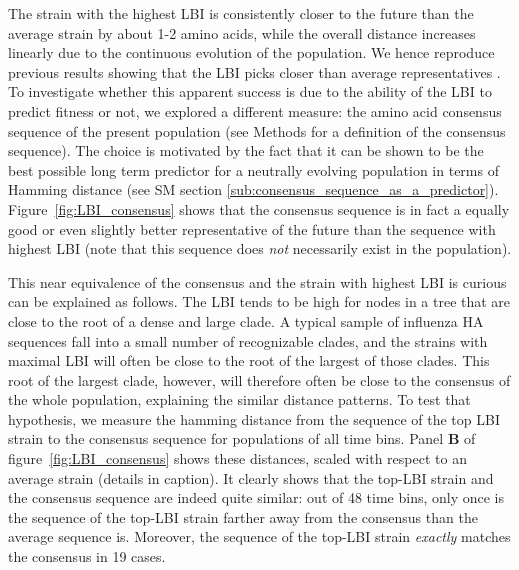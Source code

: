 \documentclass[reprint,amsmath,amssymb,superscriptaddress,showpacs,pre]{revtex4-1}
\begin{document}
The strain with the highest LBI is consistently closer to the future than the average strain by about 1-2 amino acids, while the overall distance increases linearly due to the continuous evolution of the population.
We hence reproduce previous results showing that the LBI picks closer than average representatives \citep{neher_predicting_2014}.
To investigate whether this apparent success is due to the ability of the LBI to predict fitness or not, we explored a different measure: the amino acid consensus sequence of the present population (see Methods for a definition of the consensus sequence). 
The choice is motivated by the fact that it can be shown to be the best possible long term predictor for a neutrally evolving population in terms of Hamming distance (see SM section \ref{sub:consensus_sequence_as_a_predictor}). 
Figure~\ref{fig:LBI_consensus} shows that the consensus sequence is in fact a equally good or even slightly better representative of the future than the sequence with highest LBI 
(note that this sequence does \emph{not} necessarily exist in the population). 

This near equivalence of the consensus and the strain with highest LBI is curious can be explained as follows.
The LBI tends to be high for nodes in a tree that are close to the root of a dense and large clade. 
A typical sample of influenza HA sequences fall into a small number of recognizable clades, and the strains with maximal LBI will often be close to the root of the largest of those clades. 
This root of the largest clade, however, will therefore often be close to the consensus of the whole population, explaining the similar distance patterns.
To test that hypothesis, we measure the hamming distance from the sequence of the top LBI strain to the consensus sequence for populations of all time bins. 
Panel \textbf{B} of figure~\ref{fig:LBI_consensus} shows these distances, scaled with respect to an average strain (details in caption). It clearly shows that the top-LBI strain and the consensus sequence are indeed quite similar: out of 48 time bins, only once is the sequence of the top-LBI strain farther away from the consensus than the average sequence is. Moreover, the sequence of the top-LBI strain \emph{exactly} matches the consensus in 19 cases. 
\end{document}
